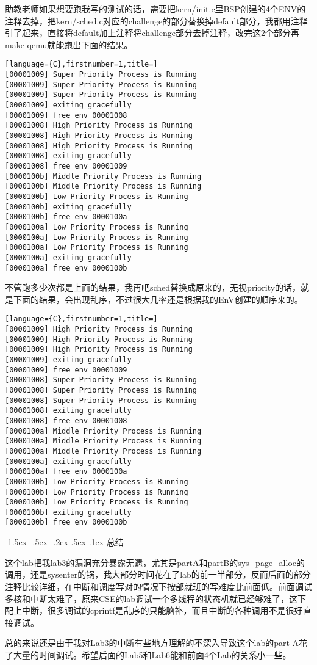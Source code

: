 \documentclass[11pt,a4paper]{article}
\makeatletter
\newcommand{\sanhao}{\fontsize{15.75pt}{\baselineskip}\selectfont}
\renewcommand\section{\@startsection{section}{1}{\z@}%
{-1.5ex \@plus -.5ex \@minus -.2ex}%
{.5ex \@plus .1ex}%
{\normalfont\sanhao\fontspec{黑体}}}
\makeatother
\begin{document}
助教老师如果想要跑我写的测试的话，需要把kern/init.c里BSP创建的4个ENV的注释去掉，把kern/sched.c对应的challenge的部分替换掉default部分，我都用注释引了起来，直接将default加上注释将challenge部分去掉注释，改完这2个部分再make qemu就能跑出下面的结果。

\setmainfont{Consolas}
\begin{lstlisting}[language={C},firstnumber=1,title=]
[00001009] Super Priority Process is Running
[00001009] Super Priority Process is Running
[00001009] Super Priority Process is Running
[00001009] exiting gracefully
[00001009] free env 00001008
[00001008] High Priority Process is Running
[00001008] High Priority Process is Running
[00001008] High Priority Process is Running
[00001008] exiting gracefully
[00001008] free env 00001009
[0000100b] Middle Priority Process is Running
[0000100b] Middle Priority Process is Running
[0000100b] Low Priority Process is Running
[0000100b] exiting gracefully
[0000100b] free env 0000100a
[0000100a] Low Priority Process is Running
[0000100a] Low Priority Process is Running
[0000100a] Low Priority Process is Running
[0000100a] exiting gracefully
[0000100a] free env 0000100b
\end{lstlisting}
\setmainfont[BoldFont=黑体]{宋体}

不管跑多少次都是上面的结果，我再吧sched替换成原来的，无视priority的话，就是下面的结果，会出现乱序，不过很大几率还是根据我的EnV创建的顺序来的。

\setmainfont{Consolas}
\begin{lstlisting}[language={C},firstnumber=1,title=]
[00001009] High Priority Process is Running
[00001009] High Priority Process is Running
[00001009] High Priority Process is Running
[00001009] exiting gracefully
[00001009] free env 00001009
[00001008] Super Priority Process is Running
[00001008] Super Priority Process is Running
[00001008] Super Priority Process is Running
[00001008] exiting gracefully
[00001008] free env 00001008
[0000100a] Middle Priority Process is Running
[0000100a] Middle Priority Process is Running
[0000100a] Middle Priority Process is Running
[0000100a] exiting gracefully
[0000100a] free env 0000100a
[0000100b] Low Priority Process is Running
[0000100b] Low Priority Process is Running
[0000100b] Low Priority Process is Running
[0000100b] exiting gracefully
[0000100b] free env 0000100b
\end{lstlisting}
\setmainfont[BoldFont=黑体]{宋体}


\section{总结}

这个lab把我lab3的漏洞充分暴露无遗，尤其是partA和partB的sys\_page\_alloc的调用，还是sysenter的锅，我大部分时间花在了lab的前一半部分，反而后面的部分注释比较详细，在中断和调度写对的情况下按部就班的写难度比前面低。前面调试多核和中断太难了，原来CSE的lab调试一个多线程的状态机就已经够难了，这下配上中断，很多调试的cprintf是乱序的只能脑补，而且中断的各种调用不是很好直接调试。

总的来说还是由于我对Lab3的中断有些地方理解的不深入导致这个lab的part A花了大量的时间调试。希望后面的Lab5和Lab6能和前面4个Lab的关系小一些。
\end{document}
